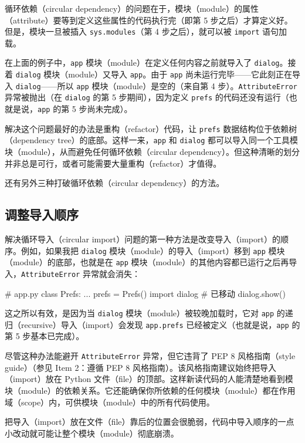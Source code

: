 循环依赖（circular dependency）的问题在于，模块（module）的属性（attribute）要等到定义这些属性的代码执行完（即第 5 步之后）才算定义好。但是，模块一旦被插入 \texttt{sys.modules}（第 4 步之后），就可以被 \texttt{import} 语句加载。

在上面的例子中，\texttt{app} 模块（module）在定义任何内容之前就导入了 \texttt{dialog}。接着 \texttt{dialog} 模块（module）又导入 \texttt{app}。由于 \texttt{app} 尚未运行完毕——它此刻正在导入 \texttt{dialog}——所以 \texttt{app} 模块（module）是空的（来自第 4 步）。\texttt{AttributeError} 异常被抛出（在 \texttt{dialog} 的第 5 步期间），因为定义 \texttt{prefs} 的代码还没有运行（也就是说，\texttt{app} 的第 5 步尚未完成）。

解决这个问题最好的办法是重构（refactor）代码，让 \texttt{prefs} 数据结构位于依赖树（dependency tree）的底部。这样一来，\texttt{app} 和 \texttt{dialog} 都可以导入同一个工具模块（module），从而避免任何循环依赖（circular dependency）。但这种清晰的划分并非总是可行，或者可能需要大量重构（refactor）才值得。

还有另外三种打破循环依赖（circular dependency）的方法。

\subsection{调整导入顺序}

解决循环导入（circular import）问题的第一种方法是改变导入（import）的顺序。例如，如果我把 \texttt{dialog} 模块（module）的导入（import）移到 \texttt{app} 模块（module）的底部，也就是在 \texttt{app} 模块（module）的其他内容都已运行之后再导入，\texttt{AttributeError} 异常就会消失：

\begin{codebox}[python]
# app.py
class Prefs:
    ...
prefs = Prefs()
import dialog  # 已移动
dialog.show()
\end{codebox}

这之所以有效，是因为当 \texttt{dialog} 模块（module）被较晚加载时，它对 \texttt{app} 的递归（recursive）导入（import）会发现 \texttt{app.prefs} 已经被定义（也就是说，\texttt{app} 的第 5 步基本已完成）。

尽管这种办法能避开 \texttt{AttributeError} 异常，但它违背了 PEP 8 风格指南（style guide）（参见 Item 2：遵循 PEP 8 风格指南）。该风格指南建议始终把导入（import）放在 Python 文件（file）的顶部。这样新读代码的人能清楚地看到模块（module）的依赖关系。它还能确保你所依赖的任何模块（module）都在作用域（scope）内，可供模块（module）中的所有代码使用。

把导入（import）放在文件（file）靠后的位置会很脆弱，代码中导入顺序的一点小改动就可能让整个模块（module）彻底崩溃。

